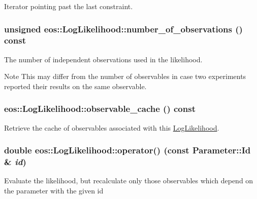 Iterator pointing past the last constraint. \hypertarget{classeos_1_1LogLikelihood_af9fe6dbe66c827e44bc500d3f2a94a6a}{
\subsubsection[{number\_\-of\_\-observations}]{\setlength{\rightskip}{0pt plus 5cm}unsigned eos::LogLikelihood::number\_\-of\_\-observations () const}}
\label{classeos_1_1LogLikelihood_af9fe6dbe66c827e44bc500d3f2a94a6a}
The number of independent observations used in the likelihood. \begin{DoxyNote}{Note}
This may differ from the number of observables in case two experiments reported their results on the same observable. 
\end{DoxyNote}
\hypertarget{classeos_1_1LogLikelihood_a3dc64fa5ee57da08f90eb18acd5bb8dd}{
\subsubsection[{observable\_\-cache}]{ eos::LogLikelihood::observable\_\-cache () const}}
\label{classeos_1_1LogLikelihood_a3dc64fa5ee57da08f90eb18acd5bb8dd}
Retrieve the cache of observables associated with this \hyperlink{classeos_1_1LogLikelihood}{LogLikelihood}. \hypertarget{classeos_1_1LogLikelihood_a289c5a378c31d4d05f4dc04af256cc84}{
\subsubsection[{operator()}]{\setlength{\rightskip}{0pt plus 5cm}double eos::LogLikelihood::operator() (const {\bf Parameter::Id} \& {\em id})}}
\label{classeos_1_1LogLikelihood_a289c5a378c31d4d05f4dc04af256cc84}
Evaluate the likelihood, but recalculate only those observables which depend on the parameter with the given id

